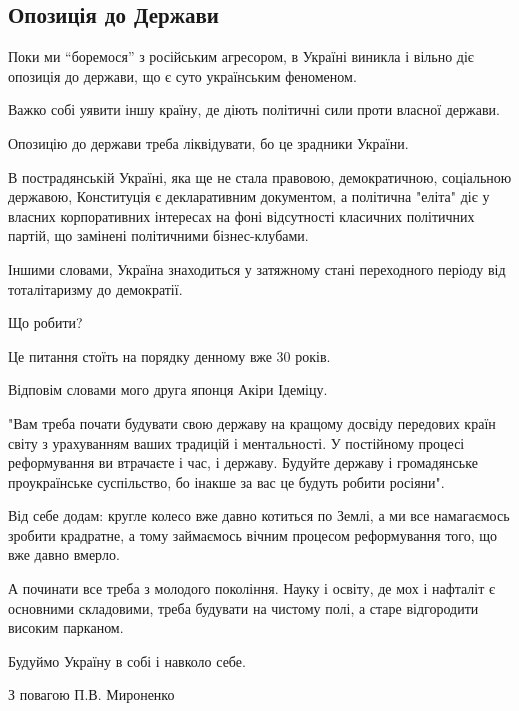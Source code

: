  
 
 
 
 
\subsection{Опозиція до Держави}
\label{sec:12_05_2021.fb.mironenko_petr.1.ukraina}

Поки ми \enquote{боремося} з російським агресором, в Україні виникла і вільно діє
опозиція до держави, що є суто українським феноменом.

Важко собі уявити іншу країну, де діють політичні сили проти власної держави.

Опозицію до держави треба ліквідувати, бо це зрадники України.

В пострадянській Україні, яка ще не стала правовою, демократичною, соціальною
державою, Конституція є декларативним документом, а політична "еліта" діє у
власних корпоративних інтересах на фоні відсутності класичних політичних
партій, що замінені політичними бізнес-клубами.

Іншими словами, Україна знаходиться у затяжному стані переходного періоду від
тоталітаризму до демократії.

Що робити?

Це питання стоїть на порядку денному вже 30 років.

Відповім словами мого друга японця Акіри Ідеміцу.

"Вам треба почати будувати свою державу на кращому досвіду передових країн
світу з урахуванням ваших традицій і ментальності. У постійному процесі
реформування ви втрачаєте і час, і державу. Будуйте державу і громадянське
проукраїнське суспільство, бо інакше за вас це будуть робити росіяни".

Від себе додам: кругле колесо вже давно котиться по Землі, а ми все намагаємось
зробити крадратне, а тому займаємось вічним процесом реформування того, що вже
давно вмерло.

А починати все треба з молодого покоління. Науку і освіту, де мох і нафталіт є
основними складовими, треба будувати на чистому полі, а старе відгородити
високим парканом.

Будуймо Україну в собі і навколо себе.

З повагою П.В. Мироненко
